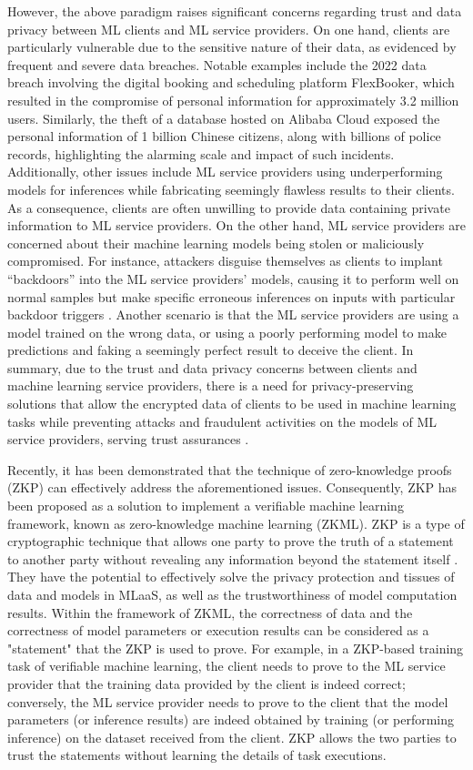 \documentclass[journal]{IEEEtran}
\begin{document}
However, the above paradigm raises significant concerns regarding trust and data privacy between ML clients and ML service providers. On one hand, clients are particularly vulnerable due to the sensitive nature of their data, as evidenced by frequent and severe data breaches. Notable examples include the 2022 data breach involving the digital booking and scheduling platform FlexBooker, which resulted in the compromise of personal information for approximately 3.2 million users. Similarly, the theft of a database hosted on Alibaba Cloud exposed the personal information of 1 billion Chinese citizens, along with billions of police records, highlighting the alarming scale and impact of such incidents. Additionally, other issues include ML service providers using underperforming models for inferences while fabricating seemingly flawless results to their clients. As a consequence, clients are often unwilling to provide data containing private information to ML service providers. On the other hand, ML service providers are concerned about their machine learning models being stolen or maliciously compromised. For instance, attackers disguise themselves as clients to implant ``backdoors'' into the ML service providers' models, causing it to perform well on normal samples but make specific erroneous inferences on inputs with particular backdoor triggers \cite{wang2019security}. Another scenario is that the ML service providers are using a model trained on the wrong data, or using a poorly performing model to make predictions and faking a seemingly perfect result to deceive the client. In summary, due to the trust and data privacy concerns between clients and machine learning service providers, there is a need for privacy-preserving solutions that allow the encrypted data of clients to be used in machine learning tasks while preventing attacks and fraudulent activities on the models of ML service providers, serving trust assurances \cite{al2019privacy}.

Recently, it has been demonstrated that the technique of zero-knowledge proofs (ZKP) can effectively address the aforementioned issues. Consequently, ZKP has been proposed as a solution to implement a verifiable machine learning framework, known as zero-knowledge machine learning (ZKML). ZKP is a type of cryptographic technique that allows one party to prove the truth of a statement to another party without revealing any information beyond the statement itself \cite{de1992zero}. They have the potential to effectively solve the privacy protection and tissues of data and models in MLaaS, as well as the trustworthiness of model computation results. Within the framework of ZKML, the correctness of data and the correctness of model parameters or execution results can be considered as a "statement" that the ZKP is used to prove. For example, in a ZKP-based training task of verifiable machine learning, the client needs to prove to the ML service provider that the training data provided by the client is indeed correct; conversely, the ML service provider needs to prove to the client that the model parameters (or inference results) are indeed obtained by training (or performing inference) on the dataset received from the client. ZKP allows the two parties to trust the statements without learning the details of task executions. 
\end{document}
